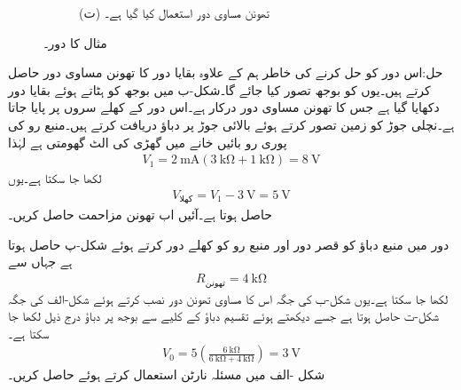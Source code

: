 \begin{figure}
\begin{subfigure}{1\textwidth}
\caption*{(ت) تھونن مساوی دور استعمال کیا گیا ہے۔}
\end{subfigure}
\caption{مثال  کا دور۔}
\label{شکل_مسئلہ__مثال_تھونن_الف}
\end{figure}

حل:اس دور کو حل کرنے کی خاطر ہم   کے علاوہ بقایا دور کا تھونن مساوی دور حاصل کرتے ہیں۔یوں  کو بوجھ تصور کیا جائے گا۔شکل-ب میں بوجھ کو ہٹاتے ہوئے بقایا دور دکھایا گیا ہے جس کا تھونن مساوی دور درکار ہے۔اس دور کے کھلے سروں پر  پایا جاتا ہے۔نچلی جوڑ کو زمین تصور کرتے ہوئے بالائی جوڑ  پر دباؤ دریافت کرتے ہیں۔منبع رو کی پوری رو بائیں خانے میں گھڑی کی الٹ گھومتی ہے لہٰذا
\begin{align*}
V_1=\SI{2}{\milli\ampere} \left(\SI{3}{\kilo\ohm}+\SI{1}{\kilo\ohm}\right)=\SI{8}{\volt}
\end{align*}
لکھا جا سکتا ہے۔یوں
\begin{align*}
V_{\text{کھلا}}= V_1-\SI{3}{\volt}=\SI{5}{\volt}
\end{align*}
حاصل ہوتا ہے۔آئیں اب تھونن مزاحمت حاصل کریں۔

دور میں منبع دباؤ کو قصر دور اور منبع رو کو کھلے دور کرتے ہوئے شکل-پ حاصل ہوتا ہے جہاں سے
\begin{align*}
R_{\text{تھونن}}=\SI{4}{\kilo\ohm}
\end{align*}
لکھا جا سکتا ہے۔یوں شکل-ب کی جگہ اس کا مساوی تھونن دور نصب کرتے ہوئے شکل-الف کی جگہ شکل-ت حاصل ہوتا ہے جسے دیکھتے ہوئے  تقسیم دباؤ کے کلیے سے بوجھ پر دباؤ  درج ذیل لکھا جا سکتا ہے۔
\begin{align}
V_0=5\left(\frac{\SI{6}{\kilo\ohm}}{\SI{6}{\kilo\ohm}+\SI{4}{\kilo\ohm}}\right)=\SI{3}{\volt}
\end{align}
شکل -الف میں مسئلہ نارٹن استعمال کرتے ہوئے  حاصل کریں۔

